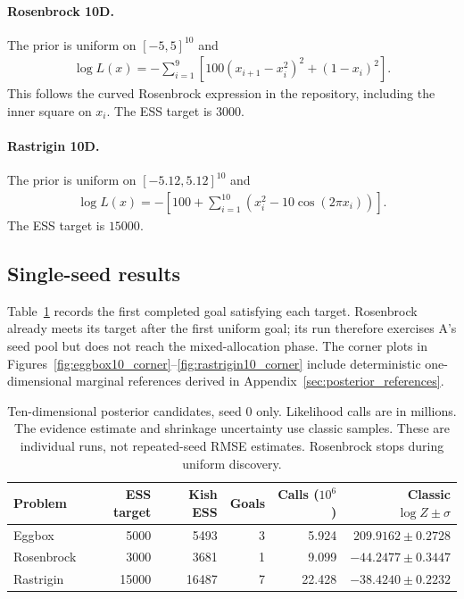 \documentclass[pdflatex,sn-basic,icol]{sn-jnl}
\theoremstyle{plain}
\theoremstyle{definition}
\begin{document}
\paragraph{Rosenbrock 10D.}
The prior is uniform on $[-5,5]^{10}$ and
\begin{align}
    \log L(x)=-\sum_{i=1}^{9}
    \left[100\left(x_{i+1}-x_i^2\right)^2+(1-x_i)^2\right].
\end{align}
This follows the curved Rosenbrock expression in the repository, including the inner square on $x_i$.
The ESS target is $3000$.

\paragraph{Rastrigin 10D.}
The prior is uniform on $[-5.12,5.12]^{10}$ and
\begin{align}
    \log L(x)=-\left[100+\sum_{i=1}^{10}
    \left(x_i^2-10\cos(2\pi x_i)\right)\right].
\end{align}
The ESS target is $15000$.

\subsection{Single-seed results}

Table~\ref{tab:posterior_candidates} records the first completed goal satisfying each target.
Rosenbrock already meets its target after the first uniform goal; its run therefore exercises A's seed pool but does not reach the mixed-allocation phase.
The corner plots in Figures~\ref{fig:eggbox10_corner}--\ref{fig:rastrigin10_corner} include deterministic one-dimensional marginal references derived in Appendix~\ref{sec:posterior_references}.

\begin{table}[t]
\centering
\caption{Ten-dimensional posterior candidates, seed $0$ only. Likelihood calls are in millions. The evidence estimate and shrinkage uncertainty use classic samples. These are individual runs, not repeated-seed RMSE estimates. Rosenbrock stops during uniform discovery.}
\label{tab:posterior_candidates}
\begin{tabular}{lrrrrr}
\toprule
Problem & ESS target & Kish ESS & Goals & Calls ($10^6$) & Classic $\log Z\pm\sigma$\\
\midrule
Eggbox & 5000 & 5493 & 3 & 5.924 & $209.9162\pm0.2728$\\
Rosenbrock & 3000 & 3681 & 1 & 9.099 & $-44.2477\pm0.3447$\\
Rastrigin & 15000 & 16487 & 7 & 22.428 & $-38.4240\pm0.2232$\\
\bottomrule
\end{tabular}
\end{table}
\end{document}
